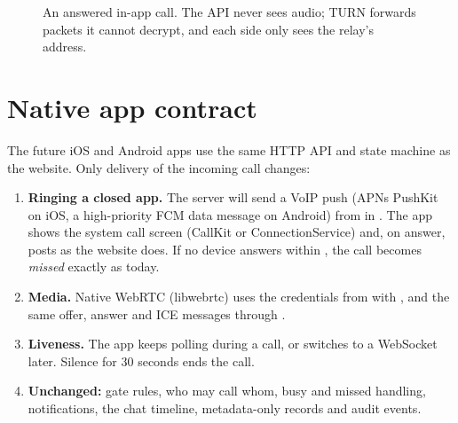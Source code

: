 \begin{figure}[H]
\centering
\begin{fitfig}
\end{fitfig}
\caption{An answered in-app call. The API never sees audio; TURN forwards packets it cannot decrypt, and each side only sees the relay's address.}
\label{fig:callseq}
\end{figure}

\section{Native app contract}
\label{sec:native}

The future iOS and Android apps use the same HTTP API and state machine as the website. Only delivery of the incoming call changes:
\begin{enumerate}
  \item \textbf{Ringing a closed app.} The server will send a VoIP push (APNs PushKit on iOS, a high-priority FCM data message on Android) from  in . The app shows the system call screen (CallKit or ConnectionService) and, on answer, posts  as the website does. If no device answers within , the call becomes \emph{missed} exactly as today.
  \item \textbf{Media.} Native WebRTC (libwebrtc) uses the credentials from  with , and the same offer, answer and ICE messages through .
  \item \textbf{Liveness.} The app keeps polling  during a call, or switches to a WebSocket later. Silence for 30 seconds ends the call.
  \item \textbf{Unchanged:} gate rules, who may call whom, busy and missed handling, notifications, the chat timeline, metadata-only records and audit events.
\end{enumerate}

